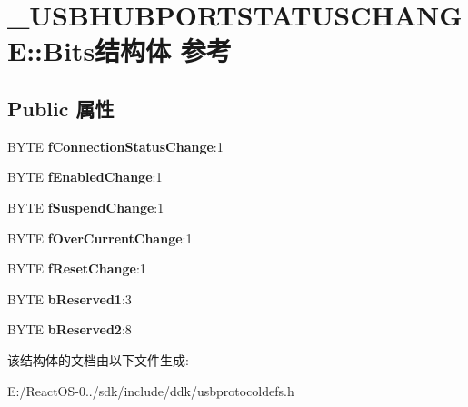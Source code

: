 \hypertarget{struct___u_s_b_h_u_b_p_o_r_t_s_t_a_t_u_s_c_h_a_n_g_e_1_1_bits}{}\section{\+\_\+\+U\+S\+B\+H\+U\+B\+P\+O\+R\+T\+S\+T\+A\+T\+U\+S\+C\+H\+A\+N\+GE\+:\+:Bits结构体 参考}
\label{struct___u_s_b_h_u_b_p_o_r_t_s_t_a_t_u_s_c_h_a_n_g_e_1_1_bits}
\subsection*{Public 属性}
\begin{DoxyCompactItemize}
\item 
\mbox{\label{struct___u_s_b_h_u_b_p_o_r_t_s_t_a_t_u_s_c_h_a_n_g_e_1_1_bits_a5318f2d6a73eebbc570470faa008f4be}} 
B\+Y\+TE {\bfseries f\+Connection\+Status\+Change}\+:1
\item 
\mbox{\label{struct___u_s_b_h_u_b_p_o_r_t_s_t_a_t_u_s_c_h_a_n_g_e_1_1_bits_ad4d3c059bf7f6a485452915e7ad26f9d}} 
B\+Y\+TE {\bfseries f\+Enabled\+Change}\+:1
\item 
\mbox{\label{struct___u_s_b_h_u_b_p_o_r_t_s_t_a_t_u_s_c_h_a_n_g_e_1_1_bits_a6717ccda8d02457ad65a218218d457bc}} 
B\+Y\+TE {\bfseries f\+Suspend\+Change}\+:1
\item 
\mbox{\label{struct___u_s_b_h_u_b_p_o_r_t_s_t_a_t_u_s_c_h_a_n_g_e_1_1_bits_a38e5ba851ad17cfcdd45eb593dcb3ec0}} 
B\+Y\+TE {\bfseries f\+Over\+Current\+Change}\+:1
\item 
\mbox{\label{struct___u_s_b_h_u_b_p_o_r_t_s_t_a_t_u_s_c_h_a_n_g_e_1_1_bits_a566741d082a5a2ab5c50a3ecfa0c76f9}} 
B\+Y\+TE {\bfseries f\+Reset\+Change}\+:1
\item 
\mbox{\label{struct___u_s_b_h_u_b_p_o_r_t_s_t_a_t_u_s_c_h_a_n_g_e_1_1_bits_ac152bcada2e957f72b50c178a689e70c}} 
B\+Y\+TE {\bfseries b\+Reserved1}\+:3
\item 
\mbox{\label{struct___u_s_b_h_u_b_p_o_r_t_s_t_a_t_u_s_c_h_a_n_g_e_1_1_bits_a7977c1a6fae61e01ae096bf4184fc4c2}} 
B\+Y\+TE {\bfseries b\+Reserved2}\+:8
\end{DoxyCompactItemize}


该结构体的文档由以下文件生成\+:\begin{DoxyCompactItemize}
\item 
E\+:/\+React\+O\+S-\/0../sdk/include/ddk/usbprotocoldefs.\+h\end{DoxyCompactItemize}

